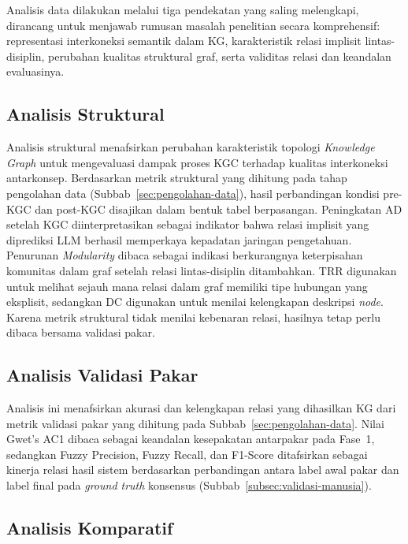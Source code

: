 \documentclass[../../thesis]{subfiles}
\begin{document}
Analisis data dilakukan melalui tiga pendekatan yang saling melengkapi,
dirancang untuk menjawab rumusan masalah penelitian secara komprehensif:
representasi interkoneksi semantik dalam KG, karakteristik relasi implisit
lintas-disiplin, perubahan kualitas struktural graf, serta validitas relasi dan
keandalan evaluasinya.

\subsection{Analisis Struktural}

Analisis struktural menafsirkan perubahan karakteristik topologi
\textit{Knowledge Graph} untuk mengevaluasi dampak proses KGC terhadap
kualitas interkoneksi antarkonsep. Berdasarkan metrik struktural yang
dihitung pada tahap pengolahan data (Subbab~\ref{sec:pengolahan-data}),
hasil perbandingan kondisi pre-KGC dan post-KGC disajikan dalam bentuk
tabel berpasangan. Peningkatan AD setelah KGC diinterpretasikan sebagai
indikator bahwa relasi implisit yang diprediksi LLM berhasil memperkaya
kepadatan jaringan pengetahuan. Penurunan \textit{Modularity} dibaca sebagai
indikasi berkurangnya keterpisahan komunitas dalam graf setelah relasi
lintas-disiplin ditambahkan. TRR digunakan untuk melihat sejauh mana relasi
dalam graf memiliki tipe hubungan yang eksplisit, sedangkan DC digunakan untuk
menilai kelengkapan deskripsi \textit{node}. Karena metrik struktural tidak
menilai kebenaran relasi, hasilnya tetap perlu dibaca bersama validasi pakar.

\subsection{Analisis Validasi Pakar}

Analisis ini menafsirkan akurasi dan kelengkapan relasi yang dihasilkan KG
dari metrik validasi pakar yang dihitung pada Subbab~\ref{sec:pengolahan-data}.
Nilai Gwet's AC1 dibaca sebagai keandalan kesepakatan antarpakar pada Fase~1,
sedangkan Fuzzy Precision, Fuzzy Recall, dan F1-Score \parencite{harju_evaluating_2023}
ditafsirkan sebagai kinerja relasi hasil sistem berdasarkan perbandingan antara
label awal pakar dan label final pada \textit{ground truth} konsensus
(Subbab~\ref{subsec:validasi-manusia}).

\subsection{Analisis Komparatif}
\end{document}

